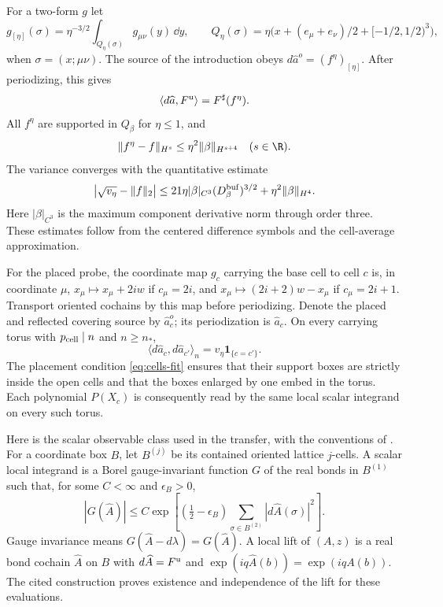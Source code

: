 For a two-form $g$ let
\[
 g_{[\eta]}(\sigma)=\eta^{-3/2}
        \int_{Q_\eta(\sigma)}g_{\mu\nu}(y)\,\dd y,\qquad
 Q_\eta(\sigma)=\eta\bigl(x+(e_\mu+e_\nu)/2+[-1/2,1/2)^3\bigr),
\]
when $\sigma=(x;\mu\nu)$. The source of the introduction obeys
$d\widehat a^o=(f^\eta)_{[\eta]}$.
After periodizing, this gives
\[
 \langle d\widehat a,F^{\rm u}\rangle=F^\sharp(f^\eta).
\]
All $f^\eta$ are supported in $Q_\beta$ for $\eta\le1$, and
\begin{equation}\label{eq:cells-test-error}
 \|f^\eta-f\|_{H^s}\le\eta^2\|\beta\|_{H^{s+4}}
                       \quad(s\in\R).
\end{equation}
The variance converges with the quantitative estimate
\begin{equation}\label{eq:cells-variance-limit}
 \left|\sqrt{v_\eta}-\|f\|_2\right|
 \le21\eta|\beta|_{C^3}(D_\beta^{\rm buf})^{3/2}
                       +\eta^2\|\beta\|_{H^4}.
\end{equation}
Here $|\beta|_{C^3}$ is the maximum component derivative norm
through order three. These estimates follow from the centered
difference symbols and the cell-average approximation.

For the placed probe, the coordinate map $g_c$ carrying the
base cell to cell $c$ is, in coordinate $\mu$,
$x_\mu\mapsto x_\mu+2iw$ if $c_\mu=2i$, and
$x_\mu\mapsto(2i+2)w-x_\mu$ if $c_\mu=2i+1$.
Transport oriented cochains by this map before periodizing.
Denote the placed and reflected covering source by
$\widehat a_c^o$; its periodization is $\widehat a_c$.
On every carrying torus with $p_{\rm cell}\mid n$ and $n\ge n_*$,
\begin{equation}\label{eq:cells-orthogonality}
 \langle d\widehat a_c,d\widehat a_{c'}\rangle_n
                         =v_\eta\mathbf1_{\{c=c'\}}.
\end{equation}
The placement condition \eqref{eq:cells-fit} ensures that their
support boxes are strictly inside the open cells and that the
boxes enlarged by one embed in the torus.
Each polynomial $P(X_c)$ is consequently read by the same
local scalar integrand on every such torus.

Here is the scalar observable class used in the transfer,
with the conventions of \cite[\S4.1, (46)--(50)]{ChamberLattice}.
For a coordinate box $B$, let $B^{(j)}$ be its contained
oriented lattice $j$-cells. A scalar local integrand is a Borel
gauge-invariant function $G$ of the real bonds in $B^{(1)}$
such that, for some $C<\infty$ and $\epsilon_B>0$,
\[
 |G(\widehat A)|\le C\exp\left[
   (\tfrac12-\epsilon_B)
          \sum_{\sigma\in B^{(2)}}|d\widehat A(\sigma)|^2\right].
\]
Gauge invariance means $G(\widehat A-d\lambda)=G(\widehat A)$.
A local lift of $(A,z)$ is a real bond cochain $\widehat A$
on $B$ with $d\widehat A=F^{\rm u}$ and
$\exp(iq\widehat A(b))=\exp(iqA(b))$.
The cited construction proves existence and independence of
the lift for these evaluations.

